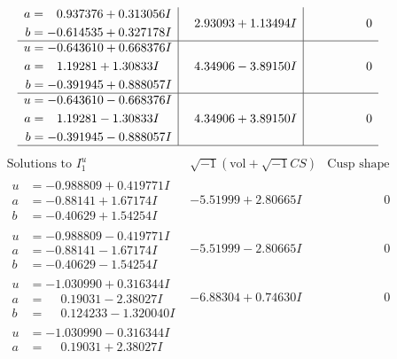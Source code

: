\documentclass[1p]{elsarticle_modified}
\theoremstyle{definition}
\newcommand{\I}{\sqrt{-1}}
\begin{document}
$$\begin{array}{c|c|c}
\begin{aligned}
a &= \phantom{-}0.937376 + 0.313056 I \\
b &= -0.614535 + 0.327178 I\end{aligned}
 & \phantom{-}2.93093 + 1.13494 I & \phantom{-0.000000 } 0 \\ \hline\begin{aligned}
u &= -0.643610 + 0.668376 I \\
a &= \phantom{-}1.19281 + 1.30833 I \\
b &= -0.391945 + 0.888057 I\end{aligned}
 & \phantom{-}4.34906 - 3.89150 I & \phantom{-0.000000 } 0 \\ \hline\begin{aligned}
u &= -0.643610 - 0.668376 I \\
a &= \phantom{-}1.19281 - 1.30833 I \\
b &= -0.391945 - 0.888057 I\end{aligned}
 & \phantom{-}4.34906 + 3.89150 I & \phantom{-0.000000 } 0\\
 \hline 
 \end{array}$$\newpage$$\begin{array}{c|c|c}  
\text{Solutions to }I^u_{1}& \I (\text{vol} + \sqrt{-1}CS) & \text{Cusp shape}\\
 \hline 
\begin{aligned}
u &= -0.988809 + 0.419771 I \\
a &= -0.88141 + 1.67174 I \\
b &= -0.40629 + 1.54254 I\end{aligned}
 & -5.51999 + 2.80665 I & \phantom{-0.000000 } 0 \\ \hline\begin{aligned}
u &= -0.988809 - 0.419771 I \\
a &= -0.88141 - 1.67174 I \\
b &= -0.40629 - 1.54254 I\end{aligned}
 & -5.51999 - 2.80665 I & \phantom{-0.000000 } 0 \\ \hline\begin{aligned}
u &= -1.030990 + 0.316344 I \\
a &= \phantom{-}0.19031 - 2.38027 I \\
b &= \phantom{-}0.124233 - 1.320040 I\end{aligned}
 & -6.88304 + 0.74630 I & \phantom{-0.000000 } 0 \\ \hline\begin{aligned}
u &= -1.030990 - 0.316344 I \\
a &= \phantom{-}0.19031 + 2.38027 I \\

\end{aligned}
\end{array}$$
\end{document}
